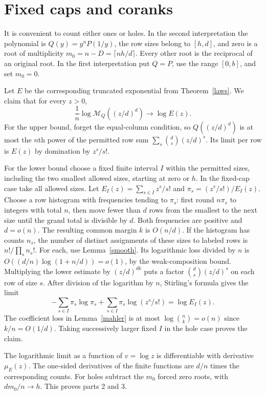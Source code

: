 \documentclass[11pt]{article}
\newcommand{\M}{\mathcal{M}}
\begin{document}
\section{Fixed caps and coranks}
It is convenient to count either ones or holes. In the second interpretation the polynomial is $Q(y)=y^nP(1/y)$, the row sizes belong to $[h,d]$, and zero is a root of multiplicity $m_0=n-D=\lceil nh/d\rceil$. Every other root is the reciprocal of an original root. In the first interpretation put $Q=P$, use the range $[0,b]$, and set $m_0=0$.

Let $E$ be the corresponding truncated exponential from Theorem~\ref{laws}. We claim that for every $z>0$,
\[
 \frac1n\log\M_Q((z/d)^d)\longrightarrow\log E(z).
\]
For the upper bound, forget the equal-column condition, so $Q((z/d)^d)$ is at most the $n$th power of the permitted row sum $\sum_s\binom ds(z/d)^s$. Its limit per row is $E(z)$ by domination by $z^s/s!$.

For the lower bound choose a fixed finite interval $I$ within the permitted sizes, including the two smallest allowed sizes, starting at zero or $h$. In the fixed-cap case take all allowed sizes. Let $E_I(z)=\sum_{s\in I}z^s/s!$ and $\pi_s=(z^s/s!)/E_I(z)$. Choose a row histogram with frequencies tending to $\pi_s$: first round $n\pi_s$ to integers with total $n$, then move fewer than $d$ rows from the smallest to the next size until the grand total is divisible by $d$. Both frequencies are positive and $d=o(n)$. The resulting common margin $k$ is $O(n/d)$. If the histogram has counts $n_s$, the number of distinct assignments of these sizes to labeled rows is $n!/\prod_s n_s!$. For each, use Lemma~\ref{smooth}. Its logarithmic loss divided by $n$ is $O((d/n)\log(1+n/d))=o(1)$, by the weak-composition bound. Multiplying the lower estimate by $(z/d)^{dk}$ puts a factor $\binom ds(z/d)^s$ on each row of size $s$. After division of the logarithm by $n$, Stirling's formula gives the limit
\[
 -\sum_{s\in I}\pi_s\log\pi_s+\sum_{s\in I}\pi_s\log(z^s/s!)=\log E_I(z).
\]
The coefficient loss in Lemma~\ref{mahler} is at most $\log\binom nk=o(n)$ since $k/n=O(1/d)$. Taking successively larger fixed $I$ in the hole case proves the claim.

The logarithmic limit as a function of $v=\log z$ is differentiable with derivative $\mu_E(z)$. The one-sided derivatives of the finite functions are $d/n$ times the corresponding counts. For holes subtract the $m_0$ forced zero roots, with $dm_0/n\to h$. This proves parts 2 and 3.
\end{document}
